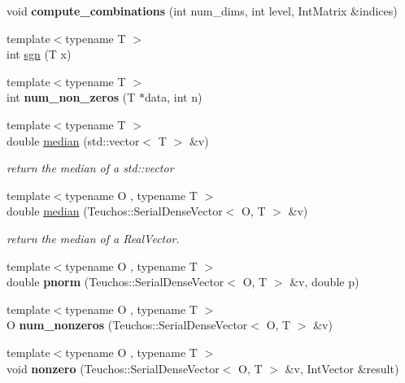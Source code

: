 \begin{DoxyCompactItemize}
\item 
void {\bfseries compute\+\_\+combinations} (int num\+\_\+dims, int level, Int\+Matrix \&indices)\label{MathTools_8cpp_a4b196d6bfb94ef8e94dc80da8ad1e6ac}

\item 
{\footnotesize template$<$typename T $>$ }\\int \hyperlink{MathTools_8hpp_a5a36d0eca26979a57433f9117966d2de}{sgn} (T x)
\item 
{\footnotesize template$<$typename T $>$ }\\int {\bfseries num\+\_\+non\+\_\+zeros} (T $\ast$data, int n)\label{MathTools_8hpp_a1db03675f04c05ba95474196ace8fd58}

\item 
{\footnotesize template$<$typename T $>$ }\\double \hyperlink{MathTools_8hpp_a87866c9f8de7a65811d08ca5b8ad220b}{median} (std\+::vector$<$ T $>$ \&v)\label{MathTools_8hpp_a87866c9f8de7a65811d08ca5b8ad220b}

\begin{DoxyCompactList}\small\item\em return the median of a std\+::vector \end{DoxyCompactList}\item 
{\footnotesize template$<$typename O , typename T $>$ }\\double \hyperlink{MathTools_8hpp_ae27ba4fdb3ecee5e5e8f14826556afd6}{median} (Teuchos\+::\+Serial\+Dense\+Vector$<$ O, T $>$ \&v)\label{MathTools_8hpp_ae27ba4fdb3ecee5e5e8f14826556afd6}

\begin{DoxyCompactList}\small\item\em return the median of a Real\+Vector. \end{DoxyCompactList}\item 
{\footnotesize template$<$typename O , typename T $>$ }\\double {\bfseries pnorm} (Teuchos\+::\+Serial\+Dense\+Vector$<$ O, T $>$ \&v, double p)\label{MathTools_8hpp_aec4bc2dde1bf8e981f334428b7f60f02}

\item 
{\footnotesize template$<$typename O , typename T $>$ }\\O {\bfseries num\+\_\+nonzeros} (Teuchos\+::\+Serial\+Dense\+Vector$<$ O, T $>$ \&v)\label{MathTools_8hpp_a9f303c0256779163b65cdb4981e2e5ad}

\item 
{\footnotesize template$<$typename O , typename T $>$ }\\void {\bfseries nonzero} (Teuchos\+::\+Serial\+Dense\+Vector$<$ O, T $>$ \&v, Int\+Vector \&result)\label{MathTools_8hpp_abb2c01c421b8d27a1353b7ec83de6353}


\end{DoxyCompactItemize}
